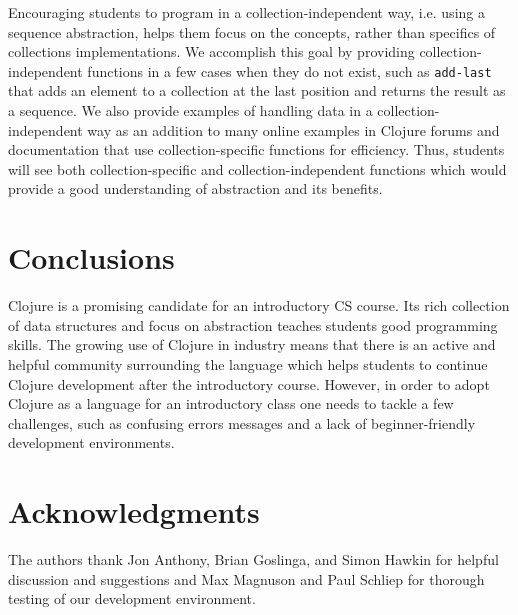 \documentclass[submission,copyright,creativecommons]{eptcs}
\newcommand{\allcomments}[1]{{#1}}
\newcommand{\joecomment}[1]{{\bf \color{JoesGold}{\allcomments{{#1}}}}}
\newcommand{\todo}[1]{{\bf \color{magenta}{\allcomments{ To-do: {#1}}}}}
\begin{document}
Encouraging students to program in a collection-independent way, i.e. using a sequence abstraction, helps them focus on the concepts, rather than specifics of collections implementations. We accomplish this goal by providing collection-independent functions in a few cases when they do not exist, such as {\tt add-last} that adds an element to a collection at the last position and returns the result as a sequence. We also provide examples of handling data in a collection-independent way as an addition to many online examples in Clojure forums and documentation that use collection-specific functions for efficiency. Thus, students will see both collection-specific and collection-independent functions which would provide a good understanding of abstraction and its benefits. 



\section{Conclusions}
Clojure is a promising candidate for an introductory CS course. Its rich collection of data structures and focus on abstraction teaches students good programming skills. The growing use of Clojure in industry means that there is an active and helpful community surrounding the language which helps students to continue Clojure development after the introductory course. However, in order to adopt Clojure as a language for an introductory class one needs to tackle a few challenges, such as confusing errors messages and  a lack of beginner-friendly development environments.

\section{Acknowledgments}
The authors thank Jon Anthony, Brian Goslinga, and Simon Hawkin for helpful discussion and suggestions and %
Max Magnuson and Paul Schliep for thorough testing of our development environment. 




\end{document}
